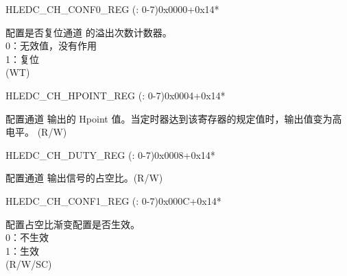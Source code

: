 \begin{register}{H}{LEDC\_CH\_CONF0\_REG (: 0-7)}{0x0000+0x14*}
\begin{regdesc}
\begin{reglist}
\label{fielddesc:LEDCOVFCNTRESETCHN}\item [LEDC\_OVF\_CNT\_RESET\_CH\regindex{n}] 配置是否复位通道  的溢出次数计数器。\\
0：无效值，没有作用\\
1：复位\\
(WT)
\end{reglist}\end{regdesc}
\end{register}


\begin{register}{H}{LEDC\_CH\_HPOINT\_REG (: 0-7)}{0x0004+0x14*}\label{regdesc:LEDCCHNHPOINTREG}
%
%
\regnewline%
\begin{regdesc}\begin{reglist}
\label{fielddesc:LEDCHPOINTCHN}\item [LEDC\_HPOINT\_CH\regindex{n}] 配置通道  输出的 Hpoint 值。当定时器达到该寄存器的规定值时，输出值变为高电平。
(R/W)
\end{reglist}\end{regdesc}
\end{register}


\begin{register}{H}{LEDC\_CH\_DUTY\_REG (: 0-7)}{0x0008+0x14*}\label{regdesc:LEDCCHNDUTYREG}
%
%
\regnewline%
\begin{regdesc}\begin{reglist}
\label{fielddesc:LEDCDUTYCHN}\item [LEDC\_DUTY\_CH\regindex{n}] 配置通道  输出信号的占空比。(R/W)
\end{reglist}\end{regdesc}
\end{register}


\begin{register}{H}{LEDC\_CH\_CONF1\_REG (: 0-7)}{0x000C+0x14*}\label{regdesc:LEDCCHNCONF1REG}
%
%
\regnewline%
\begin{regdesc}\begin{reglist}
\label{fielddesc:LEDCDUTYSTARTCHN}\item [LEDC\_DUTY\_START\_CH\regindex{n}] 配置占空比渐变配置是否生效。\\
0：不生效\\
1：生效\\
(R/W/SC)
\end{reglist}\end{regdesc}
\end{register}


